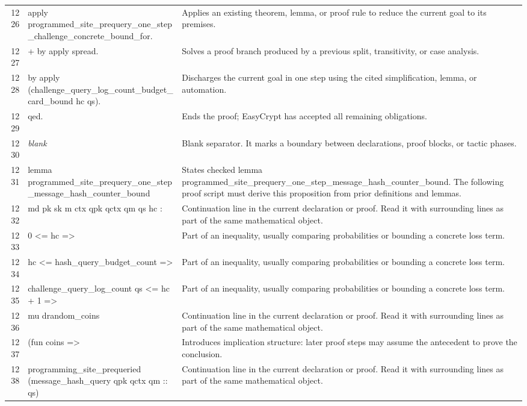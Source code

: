 \documentclass[10pt]{article}
\begin{document}
\begin{longtable}{r L{0.53\textwidth} L{0.37\textwidth}}
1226 & {\ttfamily\scriptsize apply programmed\_site\_prequery\_one\_step\_challenge\_concrete\_bound\_for.} & Applies an existing theorem, lemma, or proof rule to reduce the current goal to its premises. \\
1227 & {\ttfamily\scriptsize + by apply spread.} & Solves a proof branch produced by a previous split, transitivity, or case analysis. \\
1228 & {\ttfamily\scriptsize by apply (challenge\_query\_log\_count\_budget\_card\_bound hc qs).} & Discharges the current goal in one step using the cited simplification, lemma, or automation. \\
1229 & {\ttfamily\scriptsize qed.} & Ends the proof; EasyCrypt has accepted all remaining obligations. \\
1230 & {\ttfamily\scriptsize \emph{blank}} & Blank separator.  It marks a boundary between declarations, proof blocks, or tactic phases. \\
1231 & {\ttfamily\scriptsize lemma programmed\_site\_prequery\_one\_step\_message\_hash\_counter\_bound} & States checked lemma programmed\_site\_prequery\_one\_step\_message\_hash\_counter\_bound.  The following proof script must derive this proposition from prior definitions and lemmas. \\
1232 & {\ttfamily\scriptsize   md pk sk m ctx qpk qctx qm qs hc :} & Continuation line in the current declaration or proof.  Read it with surrounding lines as part of the same mathematical object. \\
1233 & {\ttfamily\scriptsize   0 <= hc =>} & Part of an inequality, usually comparing probabilities or bounding a concrete loss term. \\
1234 & {\ttfamily\scriptsize   hc <= hash\_query\_budget\_count =>} & Part of an inequality, usually comparing probabilities or bounding a concrete loss term. \\
1235 & {\ttfamily\scriptsize   challenge\_query\_log\_count qs <= hc + 1 =>} & Part of an inequality, usually comparing probabilities or bounding a concrete loss term. \\
1236 & {\ttfamily\scriptsize   mu drandom\_coins} & Continuation line in the current declaration or proof.  Read it with surrounding lines as part of the same mathematical object. \\
1237 & {\ttfamily\scriptsize     (fun coins =>} & Introduces implication structure: later proof steps may assume the antecedent to prove the conclusion. \\
1238 & {\ttfamily\scriptsize       programming\_site\_prequeried (message\_hash\_query qpk qctx qm :: qs)} & Continuation line in the current declaration or proof.  Read it with surrounding lines as part of the same mathematical object. \\

\end{longtable}
\end{document}
